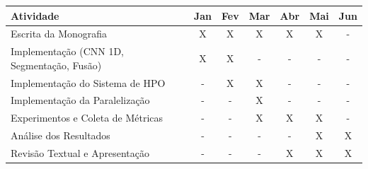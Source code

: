 \begin{quadro}[H]
    \centering
    \caption{Cronograma de atividades do TCC}
    \begin{tabular}{|p{}|c|c|c|c|c|c|}
    \hline
    \rowcolor[HTML]{C0C0C0}
    \textbf{Atividade} & \textbf{Jan} & \textbf{Fev} & \textbf{Mar} & \textbf{Abr} & \textbf{Mai} & \textbf{Jun} \\
    \hline
    Escrita da Monografia & X & X & X & X & X & - \\
    \hline
    Implementação (CNN 1D, Segmentação, Fusão) & X & X & - & - & - & - \\
    \hline
    Implementação do Sistema de HPO & - & X & X & - & - & - \\
    \hline
    Implementação da Paralelização & - & - & X & - & - & - \\
    \hline
    Experimentos e Coleta de Métricas & - & - & X & X & X & - \\
    \hline
    Análise dos Resultados & - & - & - & - & X & X \\
    \hline
    Revisão Textual e Apresentação & - & - & - & X & X & X \\
    \hline
    \end{tabular}
    \label{tab:cronograma}
\end{quadro}